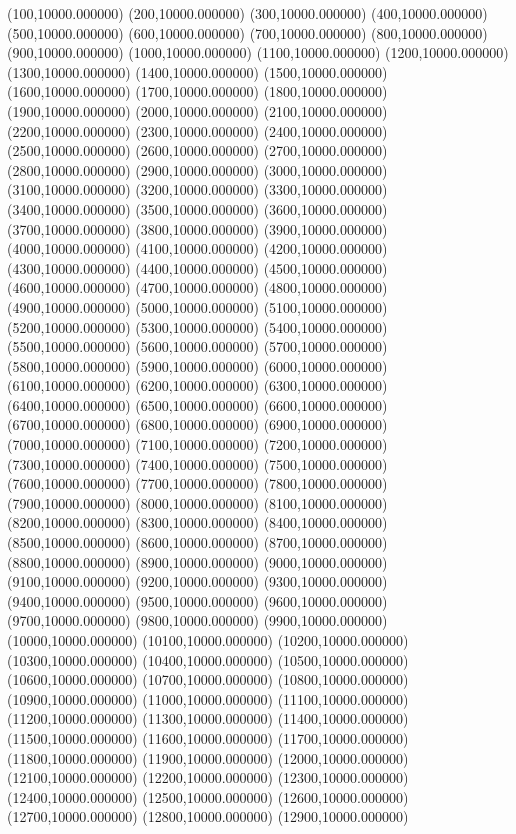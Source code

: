 (100,10000.000000)
(200,10000.000000)
(300,10000.000000)
(400,10000.000000)
(500,10000.000000)
(600,10000.000000)
(700,10000.000000)
(800,10000.000000)
(900,10000.000000)
(1000,10000.000000)
(1100,10000.000000)
(1200,10000.000000)
(1300,10000.000000)
(1400,10000.000000)
(1500,10000.000000)
(1600,10000.000000)
(1700,10000.000000)
(1800,10000.000000)
(1900,10000.000000)
(2000,10000.000000)
(2100,10000.000000)
(2200,10000.000000)
(2300,10000.000000)
(2400,10000.000000)
(2500,10000.000000)
(2600,10000.000000)
(2700,10000.000000)
(2800,10000.000000)
(2900,10000.000000)
(3000,10000.000000)
(3100,10000.000000)
(3200,10000.000000)
(3300,10000.000000)
(3400,10000.000000)
(3500,10000.000000)
(3600,10000.000000)
(3700,10000.000000)
(3800,10000.000000)
(3900,10000.000000)
(4000,10000.000000)
(4100,10000.000000)
(4200,10000.000000)
(4300,10000.000000)
(4400,10000.000000)
(4500,10000.000000)
(4600,10000.000000)
(4700,10000.000000)
(4800,10000.000000)
(4900,10000.000000)
(5000,10000.000000)
(5100,10000.000000)
(5200,10000.000000)
(5300,10000.000000)
(5400,10000.000000)
(5500,10000.000000)
(5600,10000.000000)
(5700,10000.000000)
(5800,10000.000000)
(5900,10000.000000)
(6000,10000.000000)
(6100,10000.000000)
(6200,10000.000000)
(6300,10000.000000)
(6400,10000.000000)
(6500,10000.000000)
(6600,10000.000000)
(6700,10000.000000)
(6800,10000.000000)
(6900,10000.000000)
(7000,10000.000000)
(7100,10000.000000)
(7200,10000.000000)
(7300,10000.000000)
(7400,10000.000000)
(7500,10000.000000)
(7600,10000.000000)
(7700,10000.000000)
(7800,10000.000000)
(7900,10000.000000)
(8000,10000.000000)
(8100,10000.000000)
(8200,10000.000000)
(8300,10000.000000)
(8400,10000.000000)
(8500,10000.000000)
(8600,10000.000000)
(8700,10000.000000)
(8800,10000.000000)
(8900,10000.000000)
(9000,10000.000000)
(9100,10000.000000)
(9200,10000.000000)
(9300,10000.000000)
(9400,10000.000000)
(9500,10000.000000)
(9600,10000.000000)
(9700,10000.000000)
(9800,10000.000000)
(9900,10000.000000)
(10000,10000.000000)
(10100,10000.000000)
(10200,10000.000000)
(10300,10000.000000)
(10400,10000.000000)
(10500,10000.000000)
(10600,10000.000000)
(10700,10000.000000)
(10800,10000.000000)
(10900,10000.000000)
(11000,10000.000000)
(11100,10000.000000)
(11200,10000.000000)
(11300,10000.000000)
(11400,10000.000000)
(11500,10000.000000)
(11600,10000.000000)
(11700,10000.000000)
(11800,10000.000000)
(11900,10000.000000)
(12000,10000.000000)
(12100,10000.000000)
(12200,10000.000000)
(12300,10000.000000)
(12400,10000.000000)
(12500,10000.000000)
(12600,10000.000000)
(12700,10000.000000)
(12800,10000.000000)
(12900,10000.000000)
